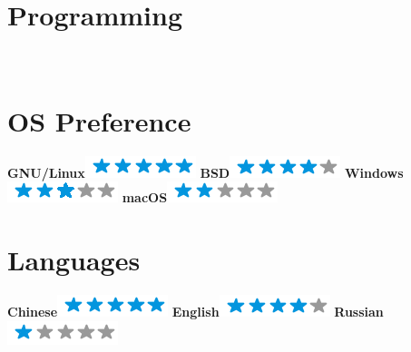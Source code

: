 \documentclass[a4paper]{friggeri-cv}
\begin{document}
\begin{aside}
  \section{Programming}
  ~
  \section{OS Preference}
  \textbf{GNU/Linux}\includegraphics[scale=0.40]{img/5stars.png}
  \textbf{BSD}\includegraphics[scale=0.40]{img/4stars.png}
  \textbf{Windows}\includegraphics[scale=0.40]{img/3stars.png}
  \textbf{macOS}\includegraphics[scale=0.40]{img/2stars.png}
  ~
  \section{Languages}
  \textbf{Chinese}\includegraphics[scale=0.40]{img/5stars.png}
  \textbf{English}\includegraphics[scale=0.40]{img/4stars.png}
  \textbf{Russian}\includegraphics[scale=0.40]{img/1stars.png}
  ~
\end{aside}
~
\end{document}
